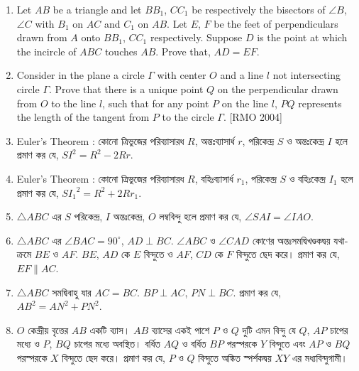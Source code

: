 \documentclass[11pt, a4paper]{article}
\begin{document}
\begin{enumerate}
	\item Let $AB$ be a triangle and let $BB_1$, $CC_1$ be respectively the bisectors of $\angle B$, $\angle C$ with $B_1$ on $AC$ and $C_1$ on $AB$. Let $E$, $F$ be the feet of perpendiculars drawn from $A$ onto $BB_1$, $CC_1$ respectively. Suppose $D$ is the point at which the incircle of $ABC$ touches $AB$. Prove that, $AD = EF$.
	
	\item Consider in the plane a circle $\Gamma$ with center $O$ and a line $l$ not intersecting circle $\Gamma$. Prove that there is a unique point $Q$ on the perpendicular drawn from $O$ to the line $l$, such that for any point $P$ on the line $l$, $PQ$ represents the length of the tangent from $P$ to the circle $\Gamma$. [RMO 2004]
	
	\item Euler's Theorem : \textbengali{কোনো ত্রিভুজের পরিব্যাসারধ} $R$, \textbengali{অন্তঃব্যাসার্ধ} $r$, \textbengali{পরিকেন্দ্র} $S$ \textbengali{ও অন্তঃকেন্দ্র} $I$ \textbengali{হলে প্রমাণ কর যে, } $SI^2 = R^2 - 2Rr$.
	
	\item Euler's Theorem : \textbengali{কোনো ত্রিভুজের পরিব্যাসারধ} $R$, \textbengali{বহিঃব্যাসার্ধ} $r_1$, \textbengali{পরিকেন্দ্র} $S$ \textbengali{ও বহিঃকেন্দ্র} $I_1$ \textbengali{হলে প্রমাণ কর যে, } $S{I_1}^2 = R^2 + 2Rr_1$.
	
	\item $\bigtriangleup ABC$ \textbengali{এর} $S$ \textbengali{পরিকেন্দ্র,} $I$ \textbengali{অন্তঃকেন্দ্র,} $O$ \textbengali{লম্ববিন্দু হলে প্রমাণ কর যে,} $\angle SAI = \angle IAO.$
	
	\item $\bigtriangleup ABC$ \textbengali{এর} $\angle BAC = 90^{\circ}$, $AD \perp BC$. $\angle ABC$ \textbengali{ও} $\angle CAD$ \textbengali{কোণের  অন্তঃসমদ্বিখণ্ডকদ্বয় যথাক্রমে} $BE$ \textbengali{ও} $AF$. $BE$, $AD$ \textbengali{কে} $E$ \textbengali{বিন্দুতে ও} $AF$, $CD$ \textbengali{কে} $F$ \textbengali{বিন্দুতে ছেদ করে। প্রমাণ কর যে,} $EF \parallel AC.$
	
	\item $\bigtriangleup ABC$ \textbengali{সমদ্বিবাহু যার} $AC=BC$. $BP \perp AC$, $PN \perp BC$. \textbengali{প্রমাণ কর যে,} $AB^2 = AN^2 + PN^2$.
	
	\item $O$ \textbengali{কেন্দ্রীয় বৃত্তের} $AB$ \textbengali{একটি ব্যাস।} $AB$ \textbengali{ব্যাসের একই পাশে} $P$ \textbengali{ও} $Q$ \textbengali{দুটি এমন বিন্দু যে} $Q$, $AP$ \textbengali{চাপের মধ্যে ও} $P$, $BQ$ \textbengali{চাপের মধ্যে অবস্থিত। বর্ধিত} $AQ$ \textbengali{ও বর্ধিত} $BP$ \textbengali{পরস্পরকে} $Y$ \textbengali{বিন্দুতে এবং} $AP$ \textbengali{ও} $BQ$ \textbengali{পরস্পরকে} $X$ \textbengali{বিন্দুতে ছেদ করে। প্রমাণ কর যে,} $P$ \textbengali{ও} $Q$ \textbengali{বিন্দুতে অঙ্কিত স্পর্শকদ্বয়} $XY$ \textbengali{এর মধ্যবিন্দুগামী।}
	

\end{enumerate}
\end{document}
